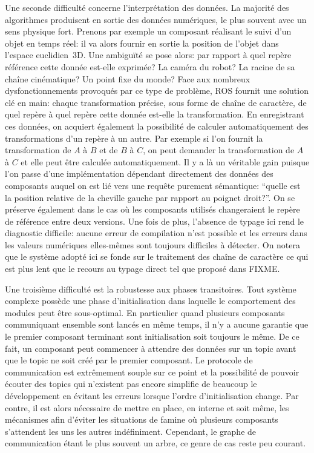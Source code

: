 Une seconde difficulté concerne l'interprétation des données. La
majorité des algorithmes produisent en sortie des données numériques,
le plus souvent avec un sens physique fort. Prenons par exemple un
composant réalisant le suivi d'un objet en temps réel: il va alors
fournir en sortie la position de l'objet dans l'espace
euclidien 3D. Une ambiguïté se pose alors: par rapport à quel repère
référence cette donnée est-elle exprimée? La caméra du robot? La
racine de sa chaîne cinématique? Un point fixe du monde? Face aux
nombreux dysfonctionnements provoqués par ce type de problème, ROS
fournit une solution clé en main: chaque transformation précise, sous
forme de chaîne de caractère, de quel repère à quel repère cette
donnée est-elle la transformation. En enregistrant ces données, on
acquiert également la possibilité de calculer automatiquement des
transformations d'un repère à un autre. Par exemple si l'on fournit la
transformation de $A$ à $B$ et de $B$ à $C$, on peut demander la
transformation de $A$ à $C$ et elle peut être calculée
automatiquement. Il y a là un véritable gain puisque l'on passe d'une
implémentation dépendant directement des données des composants auquel
on est lié vers une requête purement sémantique: ``quelle est la
position relative de la cheville gauche par rapport au poignet
droit?''. On se préserve également dans le cas où les composants
utilisés changeraient le repère de référence entre deux versions. Une
fois de plus, l'absence de typage ici rend le diagnostic difficile:
aucune erreur de compilation n'est possible et les erreurs dans les
valeurs numériques elles-mêmes sont toujours difficiles à détecter. On
notera que le système adopté ici se fonde sur le traitement des chaîne
de caractère ce qui est plus lent que le recours au typage direct tel
que proposé dans FIXME.


Une troisième difficulté est la robustesse aux phases
transitoires. Tout système complexe possède une phase d'initialisation
dans laquelle le comportement des modules peut être sous-optimal. En
particulier quand plusieurs composants communiquant ensemble sont
lancés en même temps, il n'y a aucune garantie que le premier
composant terminant sont initialisation soit toujours le même. De ce
fait, un composant peut commencer à attendre des données sur un topic
avant que le topic ne soit créé par le premier composant. Le protocole
de communication est extrêmement souple sur ce point et la possibilité
de pouvoir écouter des topics qui n'existent pas encore simplifie de
beaucoup le développement en évitant les erreurs lorsque l'ordre
d'initialisation change. Par contre, il est alors nécessaire de mettre
en place, en interne et soit même, les mécanismes afin d'éviter les
situations de famine où plusieurs composants s'attendent les uns les
autres indéfiniment. Cependant, le graphe de communication étant le
plus souvent un arbre, ce genre de cas reste peu courant.


